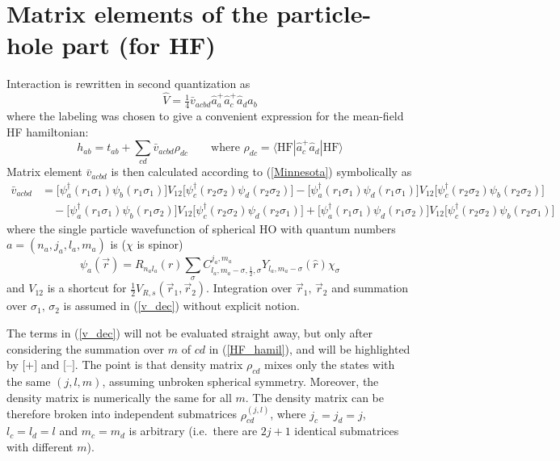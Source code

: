\documentclass[10pt,a4paper]{article}
\begin{document}
\section{Matrix elements of the particle-hole part (for HF)}
Interaction is rewritten in second quantization as
\begin{equation}
\hat{V} = \tfrac{1}{4}\bar{v}_{acbd}\hat{a}_a^+\hat{a}_c^+\hat{a}_d\hat{a}_b
\end{equation}
where the labeling was chosen to give a convenient expression for the mean-field HF hamiltonian:
\begin{equation}
\label{HF_hamil}
h_{ab} = t_{ab} + \sum_{cd}\bar{v}_{acbd}\rho_{dc} \qquad\textrm{where }
\rho_{dc} = \langle\mathrm{HF}|\hat{a}_c^+\hat{a}_d|\mathrm{HF}\rangle
\end{equation}
Matrix element $\bar{v}_{acbd}$ is then calculated according to (\ref{Minnesota}) symbolically as
\begin{subequations}\label{v_dec}
\begin{align}
\label{v_dec1}
\bar{v}_{acbd} &= \big[\psi_a^\dagger(r_1\sigma_1)\psi_b(r_1\sigma_1)\big]V_{12}
\big[\psi_c^\dagger(r_2\sigma_2)\psi_d(r_2\sigma_2)\big]
- \big[\psi_a^\dagger(r_1\sigma_1)\psi_d(r_1\sigma_1)\big]V_{12}
\big[\psi_c^\dagger(r_2\sigma_2)\psi_b(r_2\sigma_2)\big] \\
\label{v_dec2}
&\quad - \big[\psi_a^\dagger(r_1\sigma_1)\psi_b(r_1\sigma_2)\big]V_{12}
\big[\psi_c^\dagger(r_2\sigma_2)\psi_d(r_2\sigma_1)\big]
+ \big[\psi_a^\dagger(r_1\sigma_1)\psi_d(r_1\sigma_2)\big]V_{12}
\big[\psi_c^\dagger(r_2\sigma_2)\psi_b(r_2\sigma_1)\big]
\end{align}
\end{subequations}
where the single particle wavefunction of spherical HO with quantum numbers $a=(n_a,j_a,l_a,m_a)$ is ($\chi$ is spinor)
\begin{equation}
\label{spin-orbit}
\psi_a(\vec{r}) = R_{n_a l_a}(r) \sum_\sigma C_{l_a,m_a-\sigma,\frac{1}{2},\sigma}^{j_a,m_a} Y_{l_a,m_a-\sigma}(\hat{r}) \chi_\sigma
\end{equation}
and $V_{12}$ is a shortcut for $\tfrac{1}{2}V_{R,s}(\vec{r}_1,\vec{r}_2)$. Integration over $\vec{r}_1,\,\vec{r}_2$ and summation over $\sigma_1,\,\sigma_2$ is assumed in (\ref{v_dec}) without explicit notion.

The terms in (\ref{v_dec}) will not be evaluated straight away, but only after considering the summation over $m$ of $cd$ in (\ref{HF_hamil}), and will be highlighted by $\textbf{[+]}$ and $\textbf{[--]}$. The point is that density matrix $\rho_{cd}$ mixes only the states with the same $(j,l,m)$, assuming unbroken spherical symmetry. Moreover, the density matrix is numerically the same for all $m$. The density matrix can be therefore broken into independent submatrices $\rho_{cd}^{(j,l)}$, where $j_c=j_d=j$, $l_c=l_d=l$ and $m_c=m_d$ is arbitrary (i.e.~there are $2j+1$ identical submatrices with different $m$).
\end{document}
